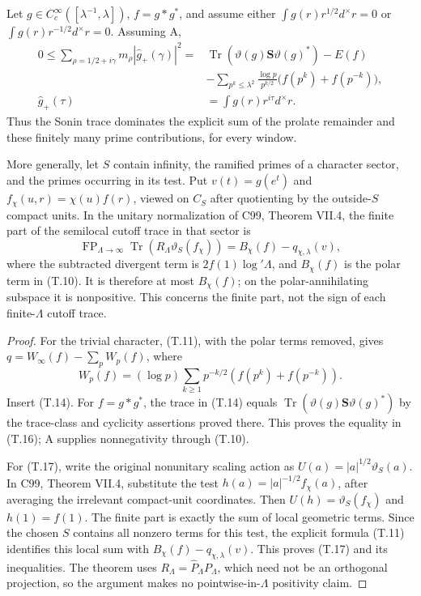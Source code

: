 \begin{theorem}
\label{AC-T07}
Let \(g\in C_c^\infty([\lambda^{-1},\lambda])\),
\(f=g*g^*\), and assume either
\(\int g(r)r^{1/2}d^\times r=0\) or
\(\int g(r)r^{-1/2}d^\times r=0\).
Assuming A,
\[
\begin{split}
 0\leq \sum_{\rho=1/2+i\gamma}m_\rho
                  |\widehat g_+(\gamma)|^2
 ={}&\operatorname{Tr}
          (\vartheta(g)\mathbf S\vartheta(g)^*)-E(f)\\
 &-\sum_{p^k\leq\lambda^2}
      \frac{\log p}{p^{k/2}}
             \bigl(f(p^k)+f(p^{-k})\bigr),
                                                               \\
 \widehat g_+(\tau)&=\int g(r)r^{i\tau}d^\times r .
\end{split}\tag{T.16}
\]
Thus the Sonin trace dominates the explicit sum of
the prolate remainder and these finitely many prime
contributions, for every window.

More generally, let \(S\) contain infinity, the
ramified primes of a character sector, and the primes
occurring in its test. Put \(v(t)=g(e^t)\) and
\(f_\chi(u,r)=\chi(u)f(r)\), viewed on \(C_S\)
after quotienting by the outside-\(S\) compact units.
In the unitary normalization of
C99, Theorem VII.4, the finite part of the semilocal
cutoff trace in that sector is
\[
 \operatorname{FP}_{\Lambda\to\infty}
 \operatorname{Tr}(R_\Lambda\vartheta_S(f_\chi))
     =B_\chi(f)-q_{\chi,\lambda}(v),                           \tag{T.17}
\]
where the subtracted divergent term is
\(2f(1)\log'\Lambda\), and \(B_\chi(f)\) is the polar
term in (T.10). It is therefore at most \(B_\chi(f)\);
on the polar-annihilating subspace it is nonpositive.
This concerns the finite part, not the sign of each
finite-\(\Lambda\) cutoff trace.
\end{theorem}

\begin{proof}
For the trivial character, (T.11), with the polar
terms removed, gives
\(q=W_\infty(f)-\sum_p W_p(f)\), where
\[
 W_p(f)=(\log p)\sum_{k\geq1}p^{-k/2}
                  (f(p^k)+f(p^{-k})).
\]
Insert (T.14). For \(f=g*g^*\), the trace in (T.14)
equals \(\operatorname{Tr}
(\vartheta(g)\mathbf S\vartheta(g)^*)\) by the
trace-class and cyclicity assertions proved there.
This proves the equality in (T.16); A supplies
nonnegativity through (T.10).

For (T.17), write the original nonunitary scaling
action as \(U(a)=|a|^{1/2}\vartheta_S(a)\).
In C99, Theorem VII.4, substitute the test
\(h(a)=|a|^{-1/2}f_\chi(a)\), after averaging the
irrelevant compact-unit coordinates. Then
\(U(h)=\vartheta_S(f_\chi)\) and \(h(1)=f(1)\).
The finite part is exactly the sum of local
geometric terms. Since the chosen \(S\) contains
all nonzero terms for this test, the explicit
formula (T.11) identifies this local sum with
\(B_\chi(f)-q_{\chi,\lambda}(v)\). This proves
(T.17) and its inequalities. The theorem uses
\(R_\Lambda=\widehat P_\Lambda P_\Lambda\), which
need not be an orthogonal projection, so the
argument makes no pointwise-in-\(\Lambda\)
positivity claim.
\end{proof}

